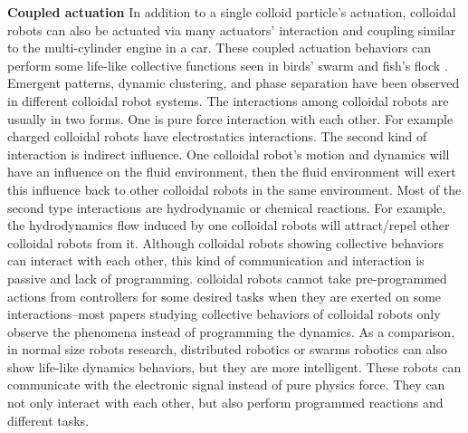 \textbf{Coupled actuation}  In addition to a single colloid particle's actuation,  colloidal robots can also be actuated via many actuators' interaction and coupling similar to the multi-cylinder engine in a car. These coupled actuation behaviors can perform some life-like collective functions seen in birds' swarm and fish's flock \autocite{wang2015one,ginot2018aggregation}. Emergent patterns, dynamic clustering, and phase separation have been observed  in different colloidal robot systems. \autocite{buttinoni2013dynamical,ginot2018aggregation,duan2013transition,theurkauff2012dynamic} The interactions among colloidal robots are usually in two forms. One is pure force interaction with each other. For example charged colloidal robots have electrostatics interactions. \autocite{dou2018emergence} The second kind of interaction is indirect influence. One colloidal robot's motion and dynamics  will have an influence on the fluid environment, then  the fluid environment will exert this influence back to other colloidal robots in the same environment. Most of the second type interactions are hydrodynamic or chemical reactions. For example, the hydrodynamics flow induced by one colloidal robots will attract/repel other colloidal robots from it. \autocite{karani2019tuning} Although colloidal robots showing collective behaviors can interact with each other, this kind of communication and interaction is passive and lack of programming. colloidal robots cannot take pre-programmed actions from controllers for some desired tasks when they are exerted on some interactions--most papers studying collective behaviors of colloidal robots only observe the phenomena instead of  programming the dynamics.  As a comparison, in normal size robots research, distributed robotics or  swarms robotics\autocite{wei2010sambot,arvin2014colias} can also show life-like dynamics behaviors, but they are more intelligent. These robots can communicate with the electronic signal instead of pure physics force. They can not only interact with each other, but also perform programmed reactions and different tasks\autocite{rubenstein2012kilobot,rubenstein2014programmable,li2019particle}.

